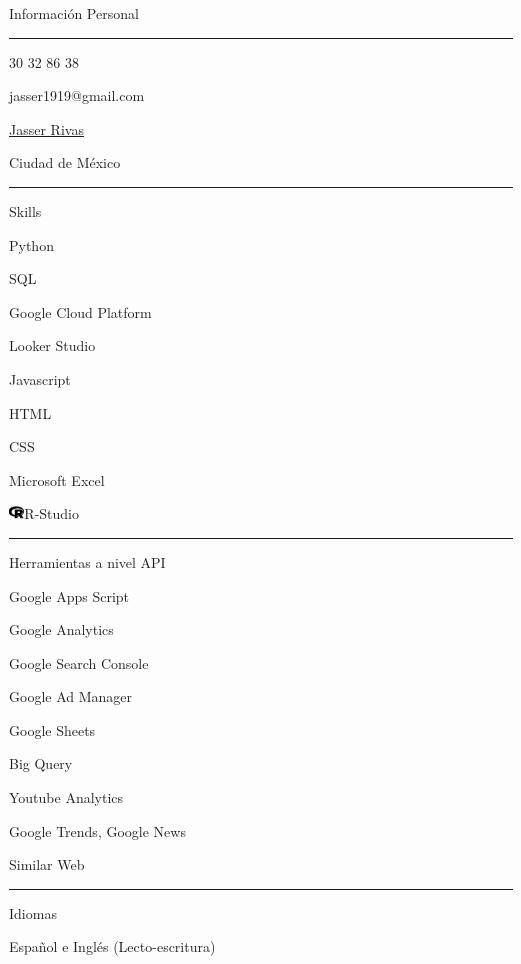 \documentclass{article}
\begin{document}
\begin{minipage}[t]{0.40\textwidth}
\setlength{\baselineskip}{1.5\baselineskip}
\color{white}
\vspace{.5cm}
{\large Información Personal}

\rule{\linewidth}{0.4pt}

\faPhone\quad  \faWhatsapp{} 30 32 86 38



\faEnvelope\quad jasser1919@gmail.com



\href{https://www.linkedin.com/in/jasser-abad-rivas-hernandez-289421209/}{\faLinkedin\quad Jasser Rivas}

\faMapMarker\quad Ciudad de México


%



\rule{\linewidth}{0.4pt}

{\large Skills}

\faPython\quad Python



\faDatabase\quad SQL

\faCloud\quad Google Cloud Platform

\faChartLine\quad Looker Studio


\faJs\quad Javascript

 \quad HTML

\quad CSS


\faWindows\quad Microsoft Excel



\includegraphics[width=0.16in, decodearray={1 0 1 0 1 0}]{r-project.png}\quad R-Studio




\rule{\linewidth}{0.4pt}

{\large Herramientas a nivel API}

\faGoogle\quad Google Apps Script

\faChartLine\quad Google Analytics

\faSearchengin\quad Google Search Console

\faFilter\quad Google Ad Manager

\faTable\quad Google Sheets

\faDatabase\quad Big Query

\faYoutube\quad Youtube Analytics

\faNewspaper\quad Google Trends, Google News

\faGlobe\quad Similar Web






\rule{\linewidth}{0.4pt}

{\large Idiomas}

\faLanguage \quad Español e Inglés (Lecto-escritura)

\end{minipage}
\end{document}

